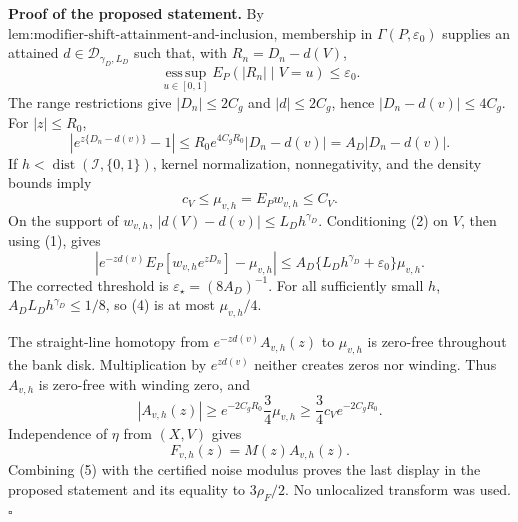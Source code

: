 \textbf{Proof of the proposed statement.}
By \(\text{lem:modifier-shift-attainment-and-inclusion}\), membership in \(\Gamma(P,\varepsilon_0)\) supplies an attained \(d\in\mathcal D_{\gamma_D,L_D}\) such that, with \(R_n=D_n-d(V)\),
\[
 \operatorname*{ess\,sup}_{u\in[0,1]}E_P(|R_n|\mid V=u)\le\varepsilon_0. \tag{1}
\]
The range restrictions give \(|D_n|\le2C_g\) and \(|d|\le2C_g\), hence \(|D_n-d(v)|\le4C_g\). For \(|z|\le R_0\),
\[
 |e^{z\{D_n-d(v)\}}-1|
 \le R_0e^{4C_gR_0}|D_n-d(v)|=A_D|D_n-d(v)|. \tag{2}
\]
If \(h<\operatorname{dist}(\mathcal I,\{0,1\})\), kernel normalization, nonnegativity, and the density bounds imply
\[
 c_V\le\mu_{v,h}=E_Pw_{v,h}\le C_V. \tag{3}
\]
On the support of \(w_{v,h}\), \(|d(V)-d(v)|\le L_Dh^{\gamma_D}\). Conditioning (2) on \(V\), then using (1), gives
\[
 \left|e^{-zd(v)}E_P[w_{v,h}e^{zD_n}]-\mu_{v,h}\right|
 \le A_D\{L_Dh^{\gamma_D}+\varepsilon_0\}\mu_{v,h}. \tag{4}
\]
The corrected threshold is \(\varepsilon_\star=(8A_D)^{-1}\). For all sufficiently small \(h\), \(A_DL_Dh^{\gamma_D}\le1/8\), so (4) is at most \(\mu_{v,h}/4\).

The straight-line homotopy from \(e^{-zd(v)}A_{v,h}(z)\) to \(\mu_{v,h}\) is zero-free throughout the bank disk. Multiplication by \(e^{zd(v)}\) neither creates zeros nor winding. Thus \(A_{v,h}\) is zero-free with winding zero, and
\[
 |A_{v,h}(z)|\ge e^{-2C_gR_0}\frac34\mu_{v,h}
 \ge\frac34c_Ve^{-2C_gR_0}. \tag{5}
\]
Independence of \(\eta\) from \((X,V)\) gives
\[
 F_{v,h}(z)=M(z)A_{v,h}(z). \tag{6}
\]
Combining (5) with the certified noise modulus proves the last display in the proposed statement and its equality to \(3\rho_F/2\). No unlocalized transform was used. \(\square\)